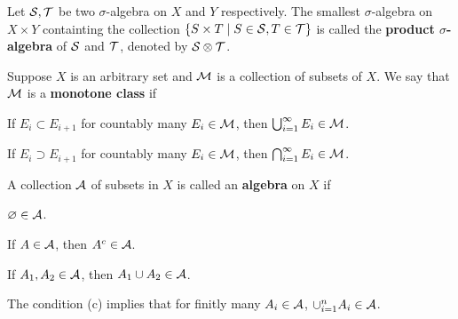\begin{definition}
    Let $\S,\T$ be two $\sigma$-algebra on $X$ and $Y$ respectively. 
    The smallest $\sigma$-algebra on $X\times Y$ containting the collection 
    $\Set{S\times T}{S\in\S, T\in\T}$ is called the \textbf{product $\sigma$-algebra} 
    of $\S$ and $\T$, denoted by $\S\otimes\T$.
\end{definition}

\begin{definition}
    Suppose $X$ is an arbitrary set and $\M$ is a collection of subsets of $X$. 
    We say that $\M$ is a \textbf{monotone class} if 
    \begin{thmenum}
        \item If $E_i\subset E_{i+1}$ for countably many $E_i\in\M$, then $\bigcup_{i=1}^\infty E_i\in\M$.
        \item If $E_i\supset E_{i+1}$ for countably many $E_i\in\M$, then $\bigcap_{i=1}^\infty E_i\in\M$.
    \end{thmenum}
\end{definition}

\begin{definition}
    A collection $\A$ of subsets in $X$ is called an \textbf{algebra} on $X$ if 
    \begin{thmenum}
        \item $\varnothing\in\A$.
        \item If $A\in\A$, then $A^c\in\A$.
        \item If $A_1,A_2\in\A$, then $A_1\cup A_2\in\A$.
    \end{thmenum}
\end{definition}
\begin{remark}
    The condition (c) implies that for finitly many $A_i\in\A$, $\cup_{i=1}^n A_i\in\A$.
\end{remark}

